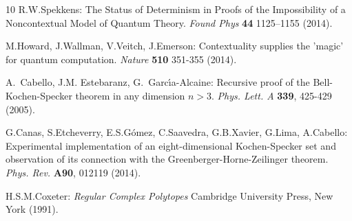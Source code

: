 \begin{thebibliography}{10}
R.W.Spekkens: The Status of Determinism in Proofs of the Impossibility of a Noncontextual Model of Quantum Theory. {\it Found Phys} {\bf 44} 1125–1155 (2014).

M.Howard, J.Wallman, V.Veitch, J.Emerson: Contextuality supplies the 'magic' for quantum computation. {\it Nature} {\bf 510} 351-355 (2014).

A.~Cabello, J.M. Estebaranz, G.~{Garc{\'\i}a-Alcaine}: Recursive proof of the Bell-Kochen-Specker theorem in any dimension $n>3$. {\it Phys. Lett. A} \textbf{{\bf 339}}, 425-429 (2005).

G.Canas, S.Etcheverry, E.S.G{\'o}mez, C.Saavedra, G.B.Xavier, G.Lima, A.Cabello: Experimental implementation of an eight-dimensional Kochen-Specker set and observation of its connection with the Greenberger-Horne-Zeilinger theorem. {\it  Phys. Rev.} {\bf A90}, 012119 (2014).

H.S.M.Coxeter: {\it Regular Complex Polytopes} Cambridge University Press, New York (1991).




















\end{thebibliography}

%
%



